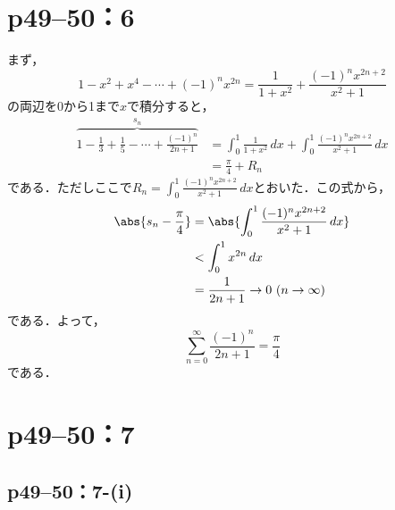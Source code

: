 \documentclass[a4paper,10pt,fleqn]{ltjsarticle}
\begin{document}
\section*{p49--50：6}
\begin{tleftbar}
    まず，
    \[
        1-x^2+x^4-\cdots+(-1)^n x^{2n} =\frac{1}{1+x^2} +\frac{(-1)^n x^{2n+2}}{x^2+1}
    \]
    の両辺を0から1まで$x$で積分すると，
    \begin{align*}
        \overbrace{1-\frac{1}{3}+\frac{1}{5}-\cdots+\frac{(-1)^n}{2n+1}}^{s_n} & =\int_{0}^{1} \frac{1}{1+x^2} \, dx +\int_{0}^{1}\frac{(-1)^n x^{2n+2}}{x^2+1}  \, dx \\
                                                                               & = \frac{\pi}{4} + R_n
    \end{align*}
    である．ただしここで$R_n =\int_{0}^{1}\frac{(-1)^n x^{2n+2}}{x^2+1} \, dx$とおいた．この式から，
    \begin{align*}
        \abs{s_n -\frac{\pi}{4}  } & = \abs{\int_{0}^{1}\frac{(-1)^n x^{2n+2}}{x^2+1} \, dx } \\
                                   & < \int_{0}^{1} x^{2n} \, dx                              \\
                                   & =\frac{1}{2n+1} \to 0 ~(n \to \infty)
    \end{align*}
    である．よって，
    \[
        \sum_{n=0}^{\infty} \frac{(-1)^n}{2n+1} =\frac{\pi}{4}
    \]
    である．
\end{tleftbar}

\newpage

\section*{p49--50：7}


\subsection*{p49--50：7-(i)}
\end{document}

